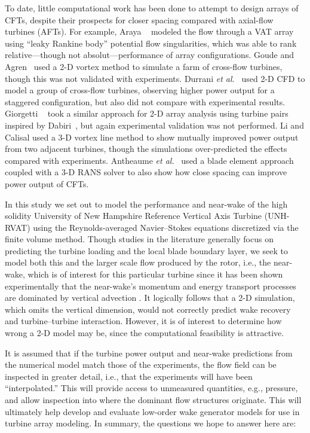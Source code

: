 To date, little computational work has been done to attempt to design arrays of
CFTs, despite their prospects for closer spacing compared with axial-flow
turbines (AFTs). For example, Araya \etal~\cite{Araya2014} modeled the flow
through a VAT array using ``leaky Rankine body'' potential flow singularities,
which was able to rank relative---though not absolut---performance of array
configurations. Goude and Agren~\cite{Goude2010} used a 2-D vortex method to
simulate a farm of cross-flow turbines, though this was not validated with
experiments. Durrani \emph{et al.}~\cite{Durrani2011} used 2-D CFD to model a
group of cross-flow turbines, observing higher power output for a staggered
configuration, but also did not compare with experimental results. Giorgetti
\etal~\cite{Giorgetti2015} took a similar approach for 2-D array analysis using
turbine pairs inspired by Dabiri~\cite{Dabiri2011}, but again experimental
validation was not performed. Li and Calisal \cite{Li2010} used a 3-D vortex
line method to show mutually improved power output from two adjacent turbines,
though the simulations over-predicted the effects compared with experiments.
Antheaume \emph{et al.}~\cite{Antheaume2008} used a blade element approach
coupled with a 3-D RANS solver to also show how close spacing can improve power
output of CFTs.

In this study we set out to model the performance and near-wake of the high
solidity University of New Hampshire Reference Vertical Axis Turbine (UNH-RVAT)
using the Reynolds-averaged Navier--Stokes equations discretized via the finite
volume method. Though studies in the literature generally focus on predicting
the turbine loading and the local blade boundary layer, we seek to model both
this and the larger scale flow produced by the rotor, i.e., the near-wake, which
is of interest for this particular turbine since it has been shown
experimentally that the near-wake's momentum and energy transport processes are
dominated by vertical advection \cite{Bachant2015-JoT}. It logically follows
that a 2-D simulation, which omits the vertical dimension, would not correctly
predict wake recovery and turbine--turbine interaction. However, it is of
interest to determine how wrong a 2-D model may be, since the computational
feasibility is attractive.

It is assumed that if the turbine power output and near-wake predictions from
the numerical model match those of the experiments, the flow field can be
inspected in greater detail, i.e., that the experiments will have been
``interpolated.'' This will provide access to unmeasured quantities, e.g.,
pressure, and allow inspection into where the dominant flow structures
originate. This will ultimately help develop and evaluate low-order wake
generator models for use in turbine array modeling. In summary, the questions we
hope to answer here are:

